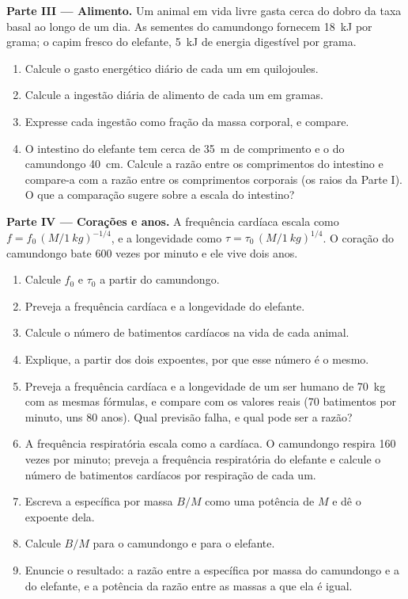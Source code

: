 \begin{problem}
\medskip
\noindent\textbf{Parte III --- Alimento.}
Um animal em vida livre gasta cerca do dobro da taxa basal ao longo de
um dia. As sementes do camundongo fornecem \qty{18}{kJ} por grama; o
capim fresco do elefante, \qty{5}{kJ} de energia digestível por grama.
\begin{enumerate}[resume]
  \item Calcule o gasto energético diário de cada um em quilojoules.
  \item Calcule a ingestão diária de alimento de cada um em gramas.
  \item Expresse cada ingestão como fração da massa corporal, e compare.
  \item O intestino do elefante tem cerca de \qty{35}{m} de comprimento
        e o do camundongo \qty{40}{cm}. Calcule a razão entre os
        comprimentos do intestino e compare-a com a razão entre os
        comprimentos corporais (os raios da Parte I). O que a comparação
        sugere sobre a escala do intestino?
\end{enumerate}

\medskip
\noindent\textbf{Parte IV --- Corações e anos.}
A frequência cardíaca escala como $f = f_0\,(M/\qty{1}{kg})^{-1/4}$, e a
longevidade como $\tau = \tau_0\,(M/\qty{1}{kg})^{1/4}$. O coração do
camundongo bate \qty{600}{} vezes por minuto e ele vive dois anos.
\begin{enumerate}[resume]
  \item Calcule $f_0$ e $\tau_0$ a partir do camundongo.
  \item Preveja a frequência cardíaca e a longevidade do elefante.
  \item Calcule o número de batimentos cardíacos na vida de cada animal.
  \item Explique, a partir dos dois expoentes, por que esse número é o
        mesmo.
  \item Preveja a frequência cardíaca e a longevidade de um ser humano
        de \qty{70}{kg} com as mesmas fórmulas, e compare com os valores
        reais (\qty{70}{} batimentos por minuto, uns \qty{80}{} anos).
        Qual previsão falha, e qual pode ser a razão?
  \item A frequência respiratória escala como a cardíaca. O camundongo
        respira \qty{160}{} vezes por minuto; preveja a frequência
        respiratória do elefante e calcule o número de batimentos
        cardíacos por respiração de cada um.
  \item Escreva a  específica por massa $B/M$ como uma
        potência de $M$ e dê o expoente dela.
  \item Calcule $B/M$ para o camundongo e para o elefante.
  \item Enuncie o resultado: a razão entre a  específica
        por massa do camundongo e a do elefante, e a potência da razão
        entre as massas a que ela é igual.
\end{enumerate}
\end{problem}

